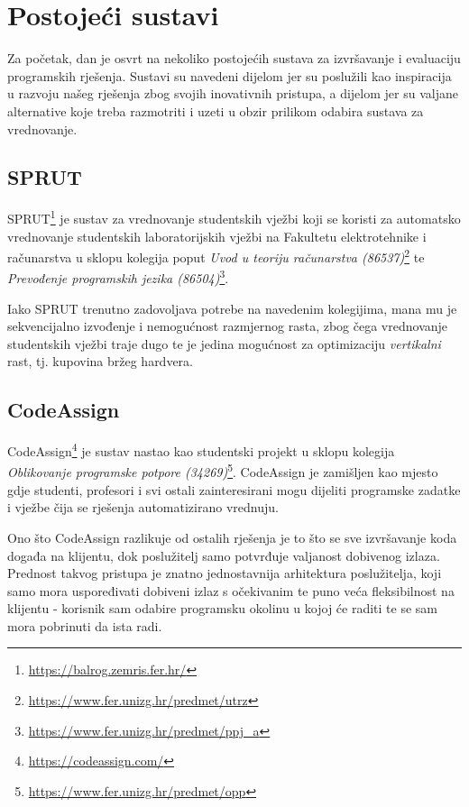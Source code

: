 \documentclass[times, utf8, zavrsni]{fer}
\begin{document}
\chapter{Postojeći sustavi}

Za početak, dan je osvrt na nekoliko postojećih sustava za izvršavanje i evaluaciju programskih rješenja. Sustavi su navedeni dijelom jer su poslužili kao inspiracija u razvoju našeg rješenja zbog svojih inovativnih pristupa, a dijelom jer su valjane alternative koje treba razmotriti i uzeti u obzir prilikom odabira sustava za vrednovanje.

\section{SPRUT}

SPRUT{\footnote{\url{https://balrog.zemris.fer.hr/}}} je sustav za vrednovanje studentskih vježbi koji se koristi za automatsko vrednovanje studentskih laboratorijskih vježbi na Fakultetu elektrotehnike i računarstva u sklopu kolegija poput {\textit{Uvod u teoriju računarstva (86537)}}{\footnote{\url{https://www.fer.unizg.hr/predmet/utrz}}} te {\textit{Prevođenje programskih jezika (86504)}}{\footnote{\url{https://www.fer.unizg.hr/predmet/ppj_a}}}.

Iako SPRUT trenutno zadovoljava potrebe na navedenim kolegijima, mana mu je sekvencijalno izvođenje i nemogućnost razmjernog rasta, zbog čega vrednovanje studentskih vježbi traje dugo te je jedina mogućnost za optimizaciju {\textit{vertikalni}} rast, tj. kupovina bržeg hardvera.

\section{CodeAssign}

CodeAssign{\footnote{\url{https://codeassign.com/}}} je sustav nastao kao studentski projekt u sklopu kolegija {\textit{Oblikovanje programske potpore (34269)}}{\footnote{\url{https://www.fer.unizg.hr/predmet/opp}}}. CodeAssign je zamišljen kao mjesto gdje studenti, profesori i svi ostali zainteresirani mogu dijeliti programske zadatke i vježbe čija se rješenja automatizirano vrednuju.

Ono što CodeAssign razlikuje od ostalih rješenja je to što se sve izvršavanje koda događa na klijentu, dok poslužitelj samo potvrđuje valjanost dobivenog izlaza. Prednost takvog pristupa je znatno jednostavnija arhitektura poslužitelja, koji samo mora uspoređivati dobiveni izlaz s očekivanim te puno veća fleksibilnost na klijentu - korisnik sam odabire programsku okolinu u kojoj će raditi te se sam mora pobrinuti da ista radi.
\end{document}
